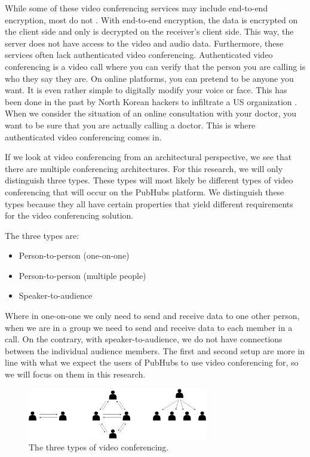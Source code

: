 \documentclass{report}
\begin{document}
While some of these video conferencing services may include end-to-end encryption, most do not \cite{gauthier_dynamic_2021}.
With end-to-end encryption, the data is encrypted on the client side and only is decrypted on the receiver's client
side. This way, the server does not have access to the video and audio data. Furthermore,
these services often lack authenticated video conferencing. Authenticated video conferencing is a video
call where you can verify that the person you are calling is who they say they are.
On online platforms, you can pretend to be anyone you want. It is even rather simple to digitally
modify your voice or face. This has been done in the past by North Korean hackers to infiltrate a US organization \cite{
noauthor_how_nodate}. When we consider the situation of an online consultation with your doctor,
you want to be sure that you are actually calling a doctor. This is where authenticated video conferencing comes in.

If we look at video conferencing from an architectural perspective, we see that there are multiple conferencing
architectures. For this research, we will only distinguish three types. These types will most likely be different types
of video conferencing that will occur on the PubHubs platform. We distinguish these types because
they all have certain properties that yield different requirements for the video conferencing solution. 

\newpage
The three types are:
\begin{itemize}
\item Person-to-person (one-on-one)
\item Person-to-person (multiple people)
\item Speaker-to-audience
\end{itemize}

Where in one-on-one we only need to send and receive data to one other person, when we are in a
group we need to send and receive data to each member in a call. On the contrary, with speaker-to-audience, we do
not have connections between the individual audience members. The first and second setup are more in line with what
we expect the users of PubHubs to use video conferencing for, so we will focus on them in this research.

\begin{figure}[!hbt]
\centering
\includegraphics[width=0.7\textwidth]{img/three-types}
\caption{The three types of video conferencing.}
\label{fig:three-types-video-conferencing}
\end{figure}
\end{document}
